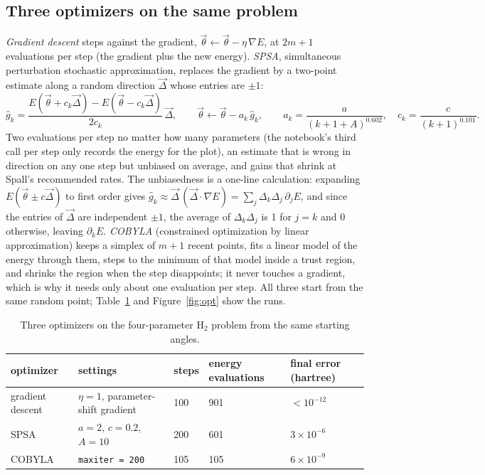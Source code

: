 \documentclass[11pt]{article}
\newcommand{\code}[1]{\texttt{#1}}
\begin{document}
\subsection{Three optimizers on the same problem}

\emph{Gradient descent} steps against the gradient, $\vec\theta \leftarrow \vec\theta - \eta\,\nabla E$, at $2m + 1$ evaluations per step (the gradient plus the new energy). \emph{SPSA}, simultaneous perturbation stochastic approximation, replaces the gradient by a two-point estimate along a random direction $\vec\Delta$ whose entries are $\pm1$:
\begin{equation}
\hat g_k = \frac{E(\vec\theta + c_k\vec\Delta) - E(\vec\theta - c_k\vec\Delta)}{2c_k}\,\vec\Delta ,\qquad
\vec\theta \leftarrow \vec\theta - a_k\,\hat g_k ,\qquad
a_k = \frac{a}{(k + 1 + A)^{0.602}},\quad c_k = \frac{c}{(k+1)^{0.101}} .
\label{eq:spsa}
\end{equation}
Two evaluations per step no matter how many parameters (the notebook's third call per step only records the energy for the plot), an estimate that is wrong in direction on any one step but unbiased on average, and gains that shrink at Spall's recommended rates. The unbiasedness is a one-line calculation: expanding $E(\vec\theta \pm c\vec\Delta)$ to first order gives $\hat g_k \approx \vec\Delta\,(\vec\Delta\cdot\nabla E) = \sum_j \Delta_k\Delta_j\,\partial_jE$, and since the entries of $\vec\Delta$ are independent $\pm1$, the average of $\Delta_k\Delta_j$ is 1 for $j = k$ and 0 otherwise, leaving $\partial_kE$. \emph{COBYLA} (constrained optimization by linear approximation) keeps a simplex of $m + 1$ recent points, fits a linear model of the energy through them, steps to the minimum of that model inside a trust region, and shrinks the region when the step disappoints; it never touches a gradient, which is why it needs only about one evaluation per step. All three start from the same random point; Table~\ref{tab:opt} and Figure~\ref{fig:opt} show the runs.

\begin{table}[h]
\centering
\small
\begin{tabular}{@{}lllll@{}}
\toprule
optimizer & settings & steps & energy evaluations & final error (hartree) \\
\midrule
gradient descent & $\eta = 1$, parameter-shift gradient & 100 & 901 & $< 10^{-12}$ \\
SPSA & $a = 2$, $c = 0.2$, $A = 10$ & 200 & 601 & $3\times10^{-6}$ \\
COBYLA & \code{maxiter = 200} & 105 & 105 & $6\times10^{-9}$ \\
\bottomrule
\end{tabular}
\caption{Three optimizers on the four-parameter $\mathrm{H}_2$ problem from the same starting angles.}
\label{tab:opt}
\end{table}
\end{document}
